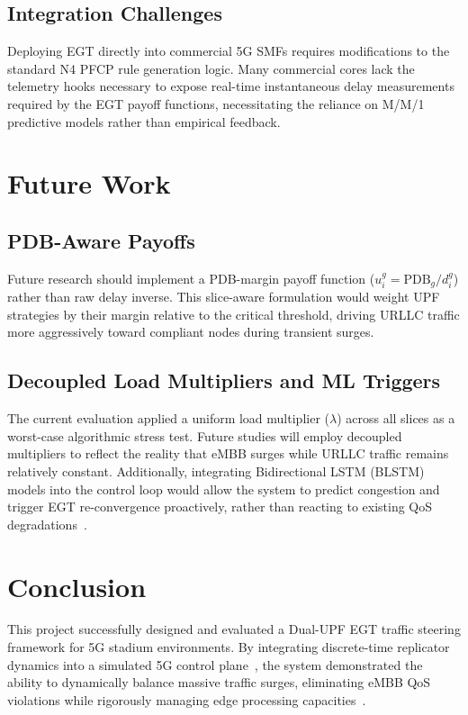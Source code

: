\documentclass[11pt,a4paper,english]{article}
\begin{document}
\subsection{Integration Challenges}
Deploying EGT directly into commercial 5G SMFs requires modifications to the standard N4 PFCP rule generation logic. Many commercial cores lack the telemetry hooks necessary to expose real-time instantaneous delay measurements required by the EGT payoff functions, necessitating the reliance on M/M/1 predictive models rather than empirical feedback.

\section{Future Work}
\subsection{PDB-Aware Payoffs}
Future research should implement a PDB-margin payoff function ($u_i^g = \text{PDB}_g / d_i^g$) rather than raw delay inverse. This slice-aware formulation would weight UPF strategies by their margin relative to the critical threshold, driving URLLC traffic more aggressively toward compliant nodes during transient surges.

\subsection{Decoupled Load Multipliers and ML Triggers}
The current evaluation applied a uniform load multiplier ($\lambda$) across all slices as a worst-case algorithmic stress test. Future studies will employ decoupled multipliers to reflect the reality that eMBB surges while URLLC traffic remains relatively constant. Additionally, integrating Bidirectional LSTM (BLSTM) models into the control loop would allow the system to predict congestion and trigger EGT re-convergence proactively, rather than reacting to existing QoS degradations~\cite{LeyvaUPC2023}.

\section{Conclusion}
This project successfully designed and evaluated a Dual-UPF EGT traffic steering framework for 5G stadium environments. By integrating discrete-time replicator dynamics into a simulated 5G control plane~\cite{oai_cn5g}, the system demonstrated the ability to dynamically balance massive traffic surges, eliminating eMBB QoS violations while rigorously managing edge processing capacities~\cite{Alevizaki2021upf}.
\end{document}
